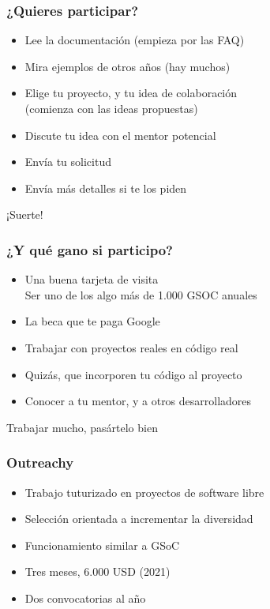 \begin{frame}
\frametitle{¿Quieres participar?}

{\Large

\begin{itemize}
\item Lee la documentación (empieza por las FAQ)
\item Mira ejemplos de otros años (hay muchos)
\item Elige tu proyecto, y tu idea de colaboración \\
  (comienza con las ideas propuestas)
\item Discute tu idea con el mentor potencial
\item Envía tu solicitud
\item Envía más detalles si te los piden
\end{itemize}

\begin{center}
¡Suerte!
\end{center}
}

\end{frame}

\begin{frame}
\frametitle{¿Y qué gano si participo?}

{\Large

\begin{itemize}
\item Una buena tarjeta de visita \\
  Ser uno de los algo más de 1.000 GSOC anuales
\item La beca que te paga Google
\item Trabajar con proyectos reales en código real
\item Quizás, que incorporen tu código al proyecto
\item Conocer a tu mentor, y a otros desarrolladores
\end{itemize}

\begin{center}
Trabajar mucho, pasártelo bien
\end{center}
}

\end{frame}

\begin{frame}
\frametitle{Outreachy}

{\Large

\begin{itemize}
\item Trabajo tuturizado en proyectos de software libre
\item Selección orientada a incrementar la diversidad
\item Funcionamiento similar a GSoC
\item Tres meses, 6.000 USD (2021)
\item Dos convocatorias al año
\end{itemize}

}

\end{frame}

